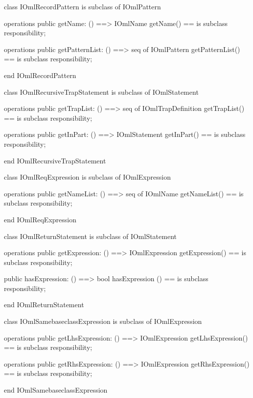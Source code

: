 \begin{vdm_al}
class IOmlRecordPattern
 is subclass of IOmlPattern

operations
  public getName: () ==> IOmlName
  getName() == is subclass responsibility;

operations
  public getPatternList: () ==> seq of IOmlPattern
  getPatternList() == is subclass responsibility;

end IOmlRecordPattern
\end{vdm_al}

\begin{vdm_al}
class IOmlRecursiveTrapStatement
 is subclass of IOmlStatement

operations
  public getTrapList: () ==> seq of IOmlTrapDefinition
  getTrapList() == is subclass responsibility;

operations
  public getInPart: () ==> IOmlStatement
  getInPart() == is subclass responsibility;

end IOmlRecursiveTrapStatement
\end{vdm_al}

\begin{vdm_al}
class IOmlReqExpression
 is subclass of IOmlExpression

operations
  public getNameList: () ==> seq of IOmlName
  getNameList() == is subclass responsibility;

end IOmlReqExpression
\end{vdm_al}

\begin{vdm_al}
class IOmlReturnStatement
 is subclass of IOmlStatement

operations
  public getExpression: () ==> IOmlExpression
  getExpression() == is subclass responsibility;

  public hasExpression: () ==> bool
  hasExpression () == is subclass responsibility;

end IOmlReturnStatement
\end{vdm_al}

\begin{vdm_al}
class IOmlSamebaseclassExpression
 is subclass of IOmlExpression

operations
  public getLhsExpression: () ==> IOmlExpression
  getLhsExpression() == is subclass responsibility;

operations
  public getRhsExpression: () ==> IOmlExpression
  getRhsExpression() == is subclass responsibility;

end IOmlSamebaseclassExpression
\end{vdm_al}


